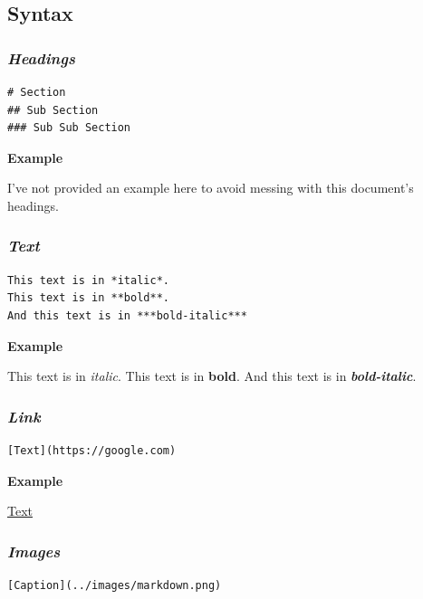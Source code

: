 \documentclass[journal,10pt,final]{IEEEtran}
\begin{document}
\subsection{Syntax}\label{syntax}

\subsubsection{\texorpdfstring{\textbf{\emph{Headings}}}{Headings}}\label{headings}

\begin{verbatim}
# Section
## Sub Section
### Sub Sub Section
\end{verbatim}

\textbf{Example}

I've not provided an example here to avoid messing with this document's
headings.

\subsubsection{\texorpdfstring{\textbf{\emph{Text}}}{Text}}\label{text}

\begin{verbatim}
This text is in *italic*.
This text is in **bold**.
And this text is in ***bold-italic***
\end{verbatim}

\textbf{Example}

This text is in \emph{italic}. This text is in \textbf{bold}. And this
text is in \textbf{\emph{bold-italic}}.

\subsubsection{\texorpdfstring{\textbf{\emph{Link}}}{Link}}\label{link}

\begin{verbatim}
[Text](https://google.com)
\end{verbatim}

\textbf{Example}

\href{https://google.com}{Text}

\subsubsection{\texorpdfstring{\textbf{\emph{Images}}}{Images}}\label{images}

\begin{verbatim}
[Caption](../images/markdown.png)
\end{verbatim}
\end{document}

